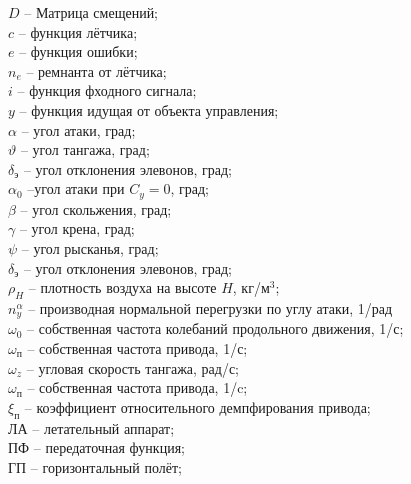 $D$ -- Матрица смещений; \\  
$c$ -- функция лётчика; \\
$e$ -- функция ошибки; \\ 
$n_e$ -- ремнанта от лётчика; \\  
$i$ -- функция фходного сигнала; \\ 
$y$ -- функция идущая от объекта управления; \\ 
$\alpha$ -- угол атаки, град; \\ 
$\vartheta$ -- угол тангажа, град; \\ 
$\delta_\text{э}$ -- угол отклонения элевонов, град; \\ 
$\alpha_0$ --угол атаки при $C_y = 0$, град;\\
$\beta$ -- угол скольжения, град; \\
$\gamma$ -- угол крена, град;\\
$\psi$ -- угол рысканья, град;\\ 
$\delta_\text{э}$ -- угол отклонения элевонов, град;\\
$\rho_H$ -- плотность воздуха на высоте $H$, кг/м$^3$;\\
$n_y^\alpha$ – производная нормальной перегрузки по углу атаки, 1/рад \\
$\omega_0$ -- собственная частота колебаний продольного движения, 1/с; \\ 
$\omega_\text{п}$ -- собственная частота привода, 1/с; \\ 
$\omega_z$ -- угловая скорость тангажа, рад/с; \\ 
$\omega_\text{п}$ -- собственная частота привода, 1/c; \\
$\xi_\text{п}$ -- коэффициент относительного демпфирования привода; \\
ЛА -- летательный аппарат; \\ 
ПФ -- передаточная функция; \\ 
ГП -- горизонтальный полёт; \\
